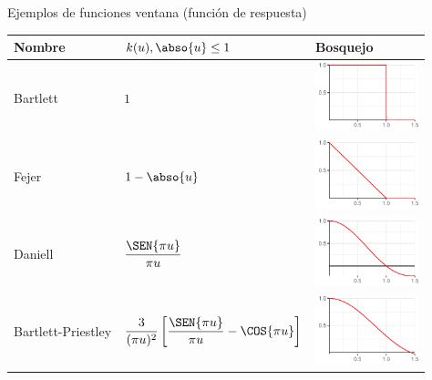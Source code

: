 \begin{SidewaysTable}
\caption{Ejemplos de funciones ventana (función de respuesta)}
\centering
{
\begin{tabular*}{\textwidth}{lll}
\toprule
Nombre & $k(u), \abso{u} \leq 1$ & Bosquejo \\
\midrule
Bartlett &
$\displaystyle 
1 
$
& \includegraphics[width=3cm,height=2cm]{./img_ventanas/ventana_bartlett.pdf}
\\
\rowcolor{gris}
Fejer &
$\displaystyle 
1-\abso{u}
$
& \includegraphics[width=3cm,height=2cm]{./img_ventanas/ventana_fejer.pdf}
\\
Daniell &
$\displaystyle 
\frac{\SEN{\pi u}}{\pi u}
$
& \includegraphics[width=3cm,height=2cm]{./img_ventanas/ventana_daniell.pdf}
\\
\rowcolor{gris}
Bartlett-Priestley &
$\displaystyle 
\frac{3}{(\pi u)^{2}} \left[ \frac{\SEN{\pi u}}{\pi u} - \COS{\pi u} \right]
$
& \includegraphics[width=3cm,height=2cm]{./img_ventanas/ventana_bartlet_priestley.pdf}
\\

\end{tabular*}}
\end{SidewaysTable}
